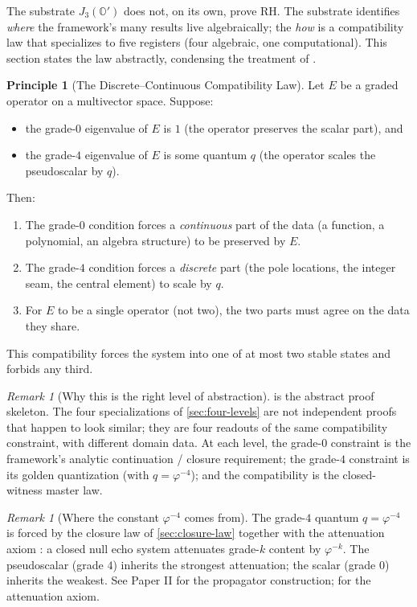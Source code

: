 \documentclass[11pt,a4paper]{article}
\theoremstyle{plain}
\theoremstyle{definition}
\newtheorem{principle}[theorem]{Principle}
\theoremstyle{remark}
\newtheorem{remark}[theorem]{Remark}
\numberwithin{equation}{section}
\providecommand{\Os}{\mathbb{O}'}
\providecommand{\vp}{\varphi}
\begin{document}
The substrate $J_3(\Os)$ does not, on its own, prove RH.  The
substrate identifies \emph{where} the framework's many results live
algebraically; the \emph{how} is a compatibility law that
specializes to five registers (four algebraic, one
computational).  This section states the law abstractly,
condensing the treatment of \cite{compatibility-tower}.

\begin{principle}[The Discrete--Continuous Compatibility Law]
\label{principle:law}
Let $E$ be a graded operator on a multivector space.  Suppose:
\begin{itemize}\itemsep0pt
  \item the grade-$0$ eigenvalue of $E$ is $1$ (the operator
    preserves the scalar part), and
  \item the grade-$4$ eigenvalue of $E$ is some quantum $q$ (the
    operator scales the pseudoscalar by $q$).
\end{itemize}
Then:
\begin{enumerate}[label=\textnormal{(\arabic*)}]
  \item The grade-$0$ condition forces a \emph{continuous} part of
    the data (a function, a polynomial, an algebra structure) to
    be preserved by $E$.
  \item The grade-$4$ condition forces a \emph{discrete} part (the
    pole locations, the integer seam, the central element) to
    scale by $q$.
  \item For $E$ to be a single operator (not two), the two
    parts must agree on the data they share.
\end{enumerate}
This compatibility forces the system into one of at most two
stable states and forbids any third.
\end{principle}

\begin{remark}[Why this is the right level of abstraction]
\label{rmk:right-level}
 is the abstract proof skeleton.  The four
specializations of \cref{sec:four-levels} are not independent
proofs that happen to look similar; they are four readouts of the
same compatibility constraint, with different domain data.  At
each level, the grade-$0$ constraint is the framework's analytic
continuation / closure requirement; the grade-$4$ constraint is
its golden quantization (with $q = \vp^{-4}$); and the
compatibility is the closed-witness master law.
\end{remark}

\begin{remark}[Where the constant $\vp^{-4}$ comes from]
\label{rmk:vp-minus-4}
The grade-$4$ quantum $q = \vp^{-4}$ is forced by the closure law
of \cref{sec:closure-law} together with the attenuation axiom
\cite[Ax.~3.1]{golden-tetrad}: a closed null echo system attenuates
grade-$k$ content by $\vp^{-k}$.  The pseudoscalar (grade $4$)
inherits the strongest attenuation; the scalar (grade $0$)
inherits the weakest.  See Paper II for the propagator
construction; \cite[Ax.~3.1]{golden-tetrad} for the attenuation
axiom.
\end{remark}
\end{document}
